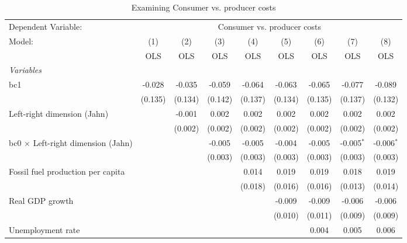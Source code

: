 
\begin{table}[htbp]
   \caption{Examining Consumer vs. producer costs}
   \centering
   \begin{tabular}{lcccccccc}
      \toprule
      Dependent Variable: & \multicolumn{8}{c}{Consumer vs. producer costs}\\
      Model:                                    & (1)     & (2)     & (3)     & (4)     & (5)     & (6)     & (7)          & (8)\\  
                                                &  OLS    & OLS     & OLS     & OLS     & OLS     & OLS     & OLS          & OLS\\  
      \midrule
      \emph{Variables}\\
      bc1                                       & -0.028  & -0.035  & -0.059  & -0.064  & -0.063  & -0.065  & -0.077       & -0.089\\   
                                                & (0.135) & (0.134) & (0.142) & (0.137) & (0.134) & (0.135) & (0.137)      & (0.132)\\   
      Left-right dimension (Jahn)               &         & -0.001  & 0.002   & 0.002   & 0.002   & 0.002   & 0.002        & 0.002\\   
                                                &         & (0.002) & (0.002) & (0.002) & (0.002) & (0.002) & (0.002)      & (0.002)\\   
      bc0 $\times$ Left-right dimension (Jahn)  &         &         & -0.005  & -0.005  & -0.004  & -0.005  & -0.005$^{*}$ & -0.006$^{*}$\\   
                                                &         &         & (0.003) & (0.003) & (0.003) & (0.003) & (0.003)      & (0.003)\\   
      Fossil fuel production per capita         &         &         &         & 0.014   & 0.019   & 0.019   & 0.018        & 0.019\\   
                                                &         &         &         & (0.018) & (0.016) & (0.016) & (0.013)      & (0.014)\\   
      Real GDP growth                           &         &         &         &         & -0.009  & -0.009  & -0.006       & -0.006\\   
                                                &         &         &         &         & (0.010) & (0.011) & (0.009)      & (0.009)\\   
      Unemployment rate                         &         &         &         &         &         & 0.004   & 0.005        & 0.006\\   

\end{tabular}
\end{table}
